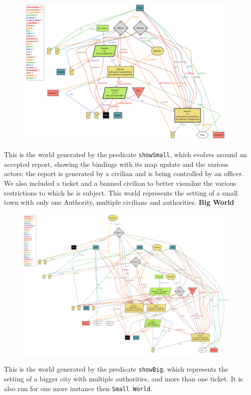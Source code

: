 \documentclass[12pt,a4paper]{article}
\begin{document}
\begin{figure}[H]
\begin{adjustwidth}{-25mm}{-25mm}
				\centering
				\includegraphics[]{Images/Alloy/smallWorld}
\end{adjustwidth}
\end{figure}
This is the world generated by the predicate \texttt{showSmall}, which evolves around an accepted report, showing the bindings with its map update and the various actors: the report is generated by a civilian and is being controlled by an officer.
We also included a ticket and a banned civilian to better visualize the various restrictions to which he is subject. This world represents the setting of a small town with only one Authority, multiple civilians and authorities.
\newpage
\textbf{\large{Big World}}
\begin{figure}[H]
\begin{adjustwidth}{-25mm}{-25mm}
\centering					        
\includegraphics[width=.95\paperwidth, keepaspectratio]{Images/Alloy/bigWorld}
					\end{adjustwidth}
\end{figure}
This is the world generated by the predicate \texttt{showBig}, which represents the setting of a bigger city with multiple authorities, and more than one ticket. It is also run for one more instance then \texttt{Small World}.
\end{document}

